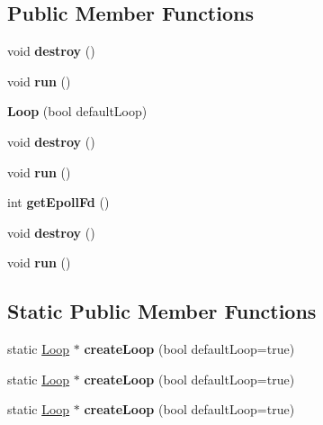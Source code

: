 \subsection*{Public Member Functions}
\begin{DoxyCompactItemize}
\item 
\mbox{\label{struct_loop_a0e4f4edfc717987a9dc16b4659511a75}} 
void {\bfseries destroy} ()
\item 
\mbox{\label{struct_loop_a65a5e4ff7f3a6be83f62270b5ef3c6a0}} 
void {\bfseries run} ()
\item 
\mbox{\label{struct_loop_aaf7ca7ed2b9aeae8c6fb572b25c79759}} 
{\bfseries Loop} (bool default\+Loop)
\item 
\mbox{\label{struct_loop_a0e4f4edfc717987a9dc16b4659511a75}} 
void {\bfseries destroy} ()
\item 
\mbox{\label{struct_loop_a65a5e4ff7f3a6be83f62270b5ef3c6a0}} 
void {\bfseries run} ()
\item 
\mbox{\label{struct_loop_acc2e05f20340b629f214ecd97f76fb7b}} 
int {\bfseries get\+Epoll\+Fd} ()
\item 
\mbox{\label{struct_loop_a0e4f4edfc717987a9dc16b4659511a75}} 
void {\bfseries destroy} ()
\item 
\mbox{\label{struct_loop_a65a5e4ff7f3a6be83f62270b5ef3c6a0}} 
void {\bfseries run} ()
\end{DoxyCompactItemize}
\subsection*{Static Public Member Functions}
\begin{DoxyCompactItemize}
\item 
\mbox{\label{struct_loop_a3ae389e2eb54a4df8ee9c8db0cec824c}} 
static \mbox{\hyperlink{struct_loop}{Loop}} $\ast$ {\bfseries create\+Loop} (bool default\+Loop=true)
\item 
\mbox{\label{struct_loop_a3ae389e2eb54a4df8ee9c8db0cec824c}} 
static \mbox{\hyperlink{struct_loop}{Loop}} $\ast$ {\bfseries create\+Loop} (bool default\+Loop=true)
\item 
\mbox{\label{struct_loop_a3ae389e2eb54a4df8ee9c8db0cec824c}} 
static \mbox{\hyperlink{struct_loop}{Loop}} $\ast$ {\bfseries create\+Loop} (bool default\+Loop=true)
\end{DoxyCompactItemize}
